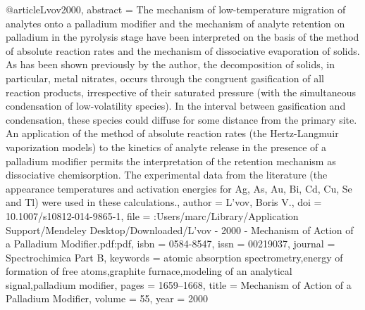 @article{Lvov2000,
abstract = {The mechanism of low-temperature migration of analytes onto a palladium modifier and the mechanism of analyte retention on palladium in the pyrolysis stage have been interpreted on the basis of the method of absolute reaction rates and the mechanism of dissociative evaporation of solids. As has been shown previously by the author, the decomposition of solids, in particular, metal nitrates, occurs through the congruent gasification of all reaction products, irrespective of their saturated pressure (with the simultaneous condensation of low-volatility species). In the interval between gasification and condensation, these species could diffuse for some distance from the primary site. An application of the method of absolute reaction rates (the Hertz-Langmuir vaporization models) to the kinetics of analyte release in the presence of a palladium modifier permits the interpretation of the retention mechanism as dissociative chemisorption. The experimental data from the literature (the appearance temperatures and activation energies for Ag, As, Au, Bi, Cd, Cu, Se and Tl) were used in these calculations.},
author = {L'vov, Boris V.},
doi = {10.1007/s10812-014-9865-1},
file = {:Users/marc/Library/Application Support/Mendeley Desktop/Downloaded/L'vov - 2000 - Mechanism of Action of a Palladium Modifier.pdf:pdf},
isbn = {0584-8547},
issn = {00219037},
journal = {Spectrochimica Part B},
keywords = {atomic absorption spectrometry,energy of formation of free atoms,graphite furnace,modeling of an analytical signal,palladium modifier},
pages = {1659--1668},
title = {{Mechanism of Action of a Palladium Modifier}},
volume = {55},
year = {2000}
}
